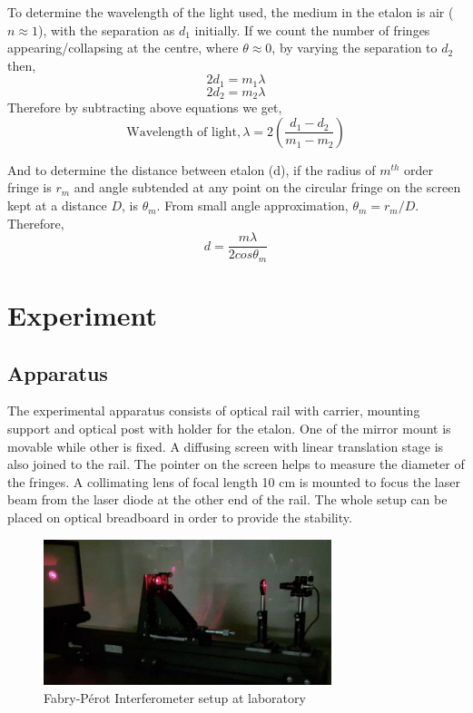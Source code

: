 \documentclass[a4paper, amsfonts, amssymb, amsmath, reprint, showkeys, nofootinbib, twoside]{revtex4-1}
\begin{document}
To determine the wavelength of the light used, the medium in the etalon is air ($n\approx1$), with the separation as $d_1$ initially. If we count the number of fringes appearing/collapsing at the centre, where $\theta\approx0$, by varying the separation to $d_2$ then,
\newline
$$2d_1=m_1\lambda$$  $$2d_2=m_2\lambda$$
\newline
Therefore by subtracting above equations we get, 
\begin{equation}\label{e1}
\text{Wavelength of light}, \lambda=2\left(\frac{d_1-d_2}{m_1-m_2}\right)
\end{equation}

And to determine the distance between etalon (d), if the radius of $m^{th}$ order fringe is $r_m$ and angle subtended at any point on the circular fringe on the screen kept at a distance $D$, is $\theta_m$. From small angle approximation, $\theta_m=r_m/D$. Therefore, 
\begin{equation}\label{e2}
d=\frac{m\lambda}{2cos\theta_m}
\end{equation}

\section{Experiment}
\subsection{Apparatus}
The experimental apparatus consists of optical rail with carrier, mounting support and optical post with holder for the etalon. One of the mirror mount is movable while other is fixed. A diffusing screen with linear translation stage is also joined to the rail. The pointer on the screen helps to measure the diameter of the fringes. A collimating lens of focal length 10 cm is mounted to focus the laser beam from the laser diode at the other end of the rail. The whole setup can be placed on optical breadboard in order to provide the stability.

\begin{figure}[htbp] %
   \centering
   \includegraphics[width=3.3in]{3} 
   \caption{Fabry-Pérot Interferometer setup at laboratory}
   \label{setup}
\end{figure}
\end{document}
